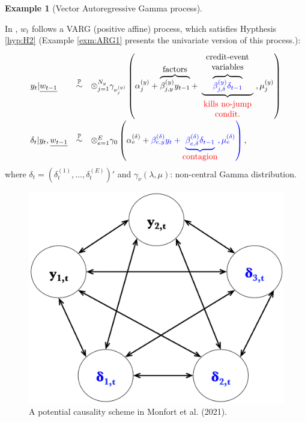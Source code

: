 \documentclass[
  12pt,
]{book}
\theoremstyle{definition}
\theoremstyle{definition}
\newtheorem{example}{Example}[chapter]
\theoremstyle{definition}
\theoremstyle{definition}
\theoremstyle{remark}
\begin{document}
\begin{example}[Vector Autoregressive Gamma process]
\protect\hypertarget{exm:exDefaultVARG}{}\label{exm:exDefaultVARG}

In \citet{Monfort_Pegoraro_Renne_Roussellet_2021}, \(w_t\) follows a VARG (positive affine) process, which satisfies Hypthesis \ref{hyp:H2} (Example \ref{exm:ARG1} presents the univariate version of this process.):
\begin{equation}
\begin{array}{lll}
y_{t}  |  \underline{w_{t-1}}  &\overset{\mathbb{P}}{\sim}&   \otimes_{j=1}^{N_y}   \gamma_{\nu_{j}^{(y)}}
\left( \alpha_{j}^{(y)} + \overbrace{\beta_{j, y}^{(y)}   y_{t-1}}^{\mbox{factors}}     +  \underbrace{ \overbrace{\color{blue}{ \beta^{(y)}_{j, \delta} \delta_{t-1}}}^{\begin{array}{c}\mbox{credit-event}\\\mbox{variables}\end{array}}}_{\begin{array}{c}\color{red}{\mbox{kills no-jump}}\\\color{red}{\mbox{condit.}}\end{array}} , \mu_j^{(y)} \right) \\
\delta_t  |  y_t, \underline{w_{t-1}}  &\overset{\mathbb{P}}{\sim}&  \otimes_{e = 1}^{E}  \gamma_{0}
\left( \alpha_e^{(\delta)} + \color{blue}{\beta^{(\delta)}_{e, y}  y_{t}} +  \underbrace{\color{blue}{\beta^{(\delta)}_{e, \delta}   \delta_{t-1}}}_{\color{red}{\mbox{contagion}}},
\mu_e^{(\delta)} \right) ,
\end{array}\label{eq:EARGs}
\end{equation}
where \(\delta_t = (\delta^{(1)}_t, \ldots, \delta^{(E)}_t)'\) and \(\gamma_{\nu} \left(\lambda, \mu \right)\): non-central Gamma distribution.

\begin{figure}

{\centering \includegraphics[width=0.7\linewidth]{figures/schema_VARG} 

}

\caption{A potential causality scheme in Monfort et al. (2021).}\label{fig:VARGschema}
\end{figure}

\end{example}
\end{document}
